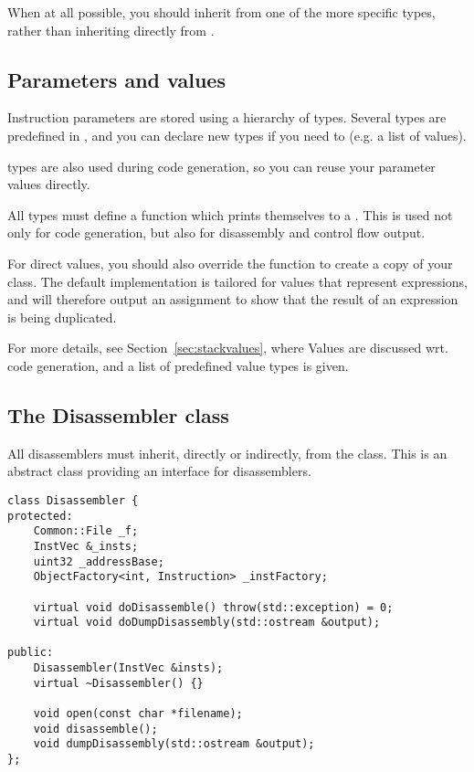 When at all possible, you should inherit from one of the more specific types, rather than inheriting directly from .

\subsection{Parameters and values}
\label{sec:parameter}
Instruction parameters are stored using a hierarchy of  types. Several types are predefined in , and you can declare new types if you need to (e.g. a list of values).

 types are also used during code generation, so you can reuse your parameter values directly.

All  types must define a  function which prints themselves to a . This is used not only for code generation, but also for disassembly and control flow output.

For direct values, you should also override the  function to create a copy of your class. The default implementation is tailored for values that represent expressions, and will therefore output an assignment to show that the result of an expression is being duplicated.

For more details, see Section~\vref{sec:stackvalues}, where Values are discussed wrt. code generation, and a list of predefined value types is given.

\subsection{The Disassembler class}
All disassemblers must inherit, directly or indirectly, from the  class. This is an abstract class providing an interface for disassemblers.

\begin{C++}
\begin{lstlisting}
class Disassembler {
protected:
	Common::File _f;
	InstVec &_insts;
	uint32 _addressBase;
	ObjectFactory<int, Instruction> _instFactory;

	virtual void doDisassemble() throw(std::exception) = 0;
	virtual void doDumpDisassembly(std::ostream &output);

public:
	Disassembler(InstVec &insts);
	virtual ~Disassembler() {}

	void open(const char *filename);
	void disassemble();
	void dumpDisassembly(std::ostream &output);
};
\end{lstlisting}
\end{C++}

